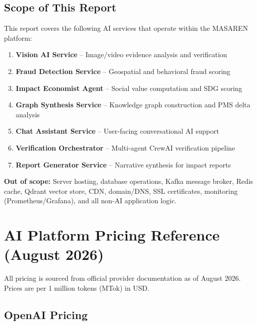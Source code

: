 \documentclass[11pt,a4paper]{article}
\begin{document}
\subsection{Scope of This Report}

This report covers the following AI services that operate within the MASAREN platform:

\begin{enumerate}[leftmargin=2em]
    \item \textbf{Vision AI Service} -- Image/video evidence analysis and verification
    \item \textbf{Fraud Detection Service} -- Geospatial and behavioral fraud scoring
    \item \textbf{Impact Economist Agent} -- Social value computation and SDG scoring
    \item \textbf{Graph Synthesis Service} -- Knowledge graph construction and PMS delta analysis
    \item \textbf{Chat Assistant Service} -- User-facing conversational AI support
    \item \textbf{Verification Orchestrator} -- Multi-agent CrewAI verification pipeline
    \item \textbf{Report Generator Service} -- Narrative synthesis for impact reports
\end{enumerate}

\textbf{Out of scope:} Server hosting, database operations, Kafka message broker, Redis cache, Qdrant vector store, CDN, domain/DNS, SSL certificates, monitoring (Prometheus/Grafana), and all non-AI application logic.

\newpage

\section{AI Platform Pricing Reference (August 2026)}

All pricing is sourced from official provider documentation as of August 2026. Prices are per 1 million tokens (MTok) in USD.

\subsection{OpenAI Pricing}
\end{document}

